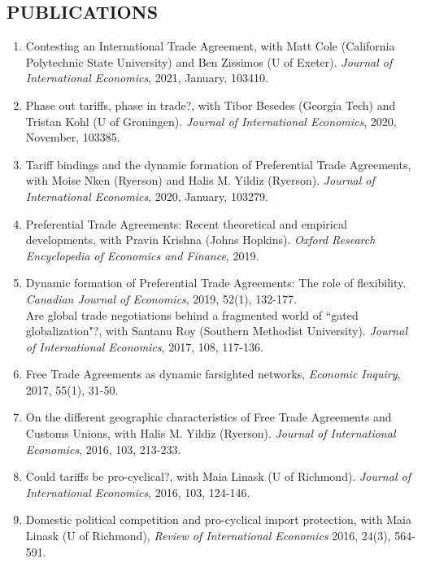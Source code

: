 \documentclass[11pt]{res}
\begin{document}
\begin{resume}
\hspace{-0.5in}\makebox[6.1in]{\hrulefill}

\section{PUBLICATIONS}\vspace{5.5mm}
\begin{enumerate}
\item Contesting an International Trade Agreement, with Matt Cole (California Polytechnic State University) and Ben Zissimos (U of Exeter). \emph{Journal of International Economics}, 2021, January, 103410.
\item{Phase out tariffs, phase in trade?}, with Tibor Besedes (Georgia Tech) and Tristan Kohl (U of Groningen). \emph{Journal of International Economics}, 2020, November, 103385.
\item{Tariff bindings and the dynamic formation of Preferential Trade Agreements}, with Moise Nken (Ryerson) and Halis M. Yildiz (Ryerson). \emph{Journal of International Economics}, 2020, January, 103279.
\item{Preferential Trade Agreements: Recent theoretical and empirical developments}, with Pravin Krishna (Johns Hopkins). \emph{Oxford Research Encyclopedia of Economics and Finance}, 2019.
\item{Dynamic formation of Preferential Trade Agreements: The role of flexibility}. \emph{Canadian Journal of Economics}, 2019, 52(1), 132-177. \vspace{1.5mm}\\
{Are global trade negotiations behind a fragmented world of ``gated globalization"?}, with Santanu Roy (Southern Methodist University). \emph{Journal of International Economics}, 2017, 108, 117-136.
\item{ Free Trade Agreements as dynamic farsighted networks}, \emph{Economic Inquiry}, 2017, 55(1), 31-50.
\item{On the different geographic characteristics of Free Trade Agreements and Customs Unions}, with Halis M. Yildiz (Ryerson). \emph{Journal of International Economics}, 2016, 103, 213-233.
\item{Could tariffs be pro-cyclical?}, with Maia Linask (U of Richmond). \emph{Journal of International Economics}, 2016, 103, 124-146.
\item{Domestic political competition and pro-cyclical import protection}, with Maia Linask (U of Richmond), \emph{Review of International Economics} 2016, 24(3), 564-591.

\end{enumerate}
\end{resume}
\end{document}
